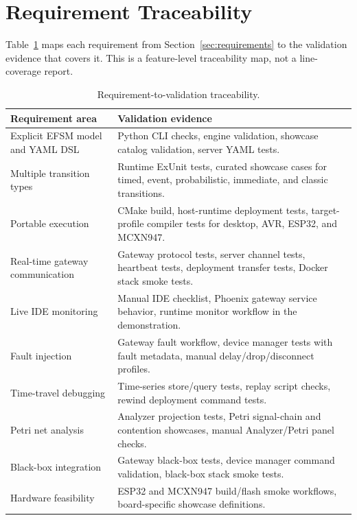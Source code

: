 \section{Requirement Traceability}

Table~\ref{tab:validation-traceability} maps each requirement from Section~\ref{sec:requirements} to the validation evidence that covers it. This is a feature-level traceability map, not a line-coverage report.

\begin{table}[!htbp]
  \centering
  \caption{Requirement-to-validation traceability.}
  \label{tab:validation-traceability}
  \vskip6pt
  \begin{tabularx}{\textwidth}{>{\raggedright\arraybackslash}p{}X}
    \toprule
    Requirement area & Validation evidence \\
    \midrule
    Explicit EFSM model and YAML DSL & Python CLI checks, engine validation, showcase catalog validation, server YAML tests. \\
    Multiple transition types & Runtime ExUnit tests, curated showcase cases for timed, event, probabilistic, immediate, and classic transitions. \\
    Portable execution & CMake build, host-runtime deployment tests, target-profile compiler tests for desktop, AVR, ESP32, and MCXN947. \\
    Real-time gateway communication & Gateway protocol tests, server channel tests, heartbeat tests, deployment transfer tests, Docker stack smoke tests. \\
    Live IDE monitoring & Manual IDE checklist, Phoenix gateway service behavior, runtime monitor workflow in the demonstration. \\
    Fault injection & Gateway fault workflow, device manager tests with fault metadata, manual delay/drop/disconnect profiles. \\
    Time-travel debugging & Time-series store/query tests, replay script checks, rewind deployment command tests. \\
    Petri net analysis & Analyzer projection tests, Petri signal-chain and contention showcases, manual Analyzer/Petri panel checks. \\
    Black-box integration & Gateway black-box tests, device manager command validation, black-box stack smoke tests. \\
    Hardware feasibility & ESP32 and MCXN947 build/flash smoke workflows, board-specific showcase definitions. \\
    \bottomrule
  \end{tabularx}
\end{table}

